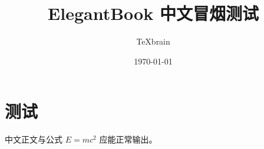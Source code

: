 \documentclass[11pt,a4paper,cn,ctexfont]{elegantbook}
\title{ElegantBook 中文冒烟测试}
\author{TeXbrain}
\date{\today}
\begin{document}
\maketitle
\chapter{测试}
中文正文与公式 $E=mc^2$ 应能正常输出。
\end{document}
